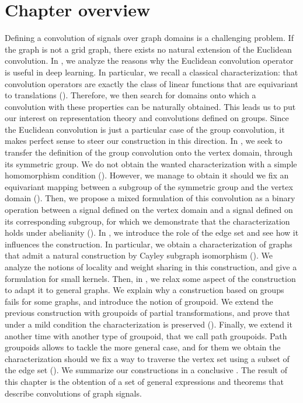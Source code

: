 \section*{Chapter overview}

Defining a convolution of signals over graph domains is a challenging problem. If the graph is not a grid graph, there exists no natural extension of the Euclidean convolution. In , we analyze the reasons why the Euclidean convolution operator is useful in deep learning. In particular, we recall a classical characterization: that convolution operators are exactly the class of linear functions that are equivariant to translations (). Therefore, we then search for domains onto which a convolution with these properties can be naturally obtained. This leads us to put our interest on representation theory and convolutions defined on groups. Since the Euclidean convolution is just a particular case of the group convolution, it makes perfect sense to steer our construction in this direction. In , we seek to transfer the definition of the group convolution onto the vertex domain, through its symmetric group. We do not obtain the wanted characterization with a simple homomorphism condition (). However, we manage to obtain it should we fix an equivariant mapping between a subgroup of the symmetric group and the vertex domain (). Then, we propose a mixed formulation of this convolution as a binary operation between a signal defined on the vertex domain and a signal defined on its corresponding subgroup, for which we demonstrate that the characterization holds under abelianity (). In , we introduce the role of the edge set and see how it influences the construction. In particular, we obtain a characterization of graphs that admit a natural construction by Cayley subgraph isomorphism (). We analyze the notions of locality and weight sharing in this construction, and give a formulation for small kernels. Then, in , we relax some aspect of the construction to adapt it to general graphs. We explain why a construction based on groups fails for some graphs, and introduce the notion of groupoid. We extend the previous construction with groupoids of partial transformations, and prove that under a mild condition the characterization is preserved (). Finally, we extend it another time with another type of groupoid, that we call path groupoids. Path groupoids allows to tackle the more general case, and for them we obtain the characterization should we fix a way to traverse the vertex set using a subset of the edge set (). We summarize our constructions in a conclusive . The result of this chapter is the obtention of a set of general expressions and theorems that describe convolutions of graph signals.